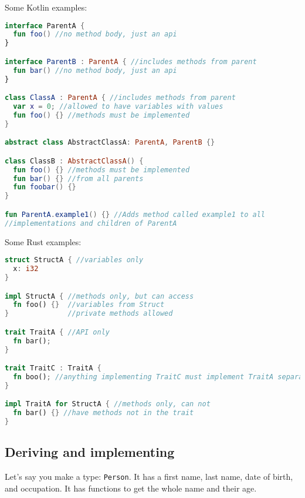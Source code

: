 \documentclass[a4paper,11pt]{article}
\begin{document}
\newpage
Some Kotlin examples:
\begin{lstlisting}[language=Kotlin,frame=single]
interface ParentA {
  fun foo() //no method body, just an api
}

interface ParentB : ParentA { //includes methods from parent
  fun bar() //no method body, just an api
}

class ClassA : ParentA { //includes methods from parent
  var x = 0; //allowed to have variables with values
  fun foo() {} //methods must be implemented
}

abstract class AbstractClassA: ParentA, ParentB {}

class ClassB : AbstractClassA() {
  fun foo() {} //methods must be implemented
  fun bar() {} //from all parents
  fun foobar() {}
}

fun ParentA.example1() {} //Adds method called example1 to all
//implementations and children of ParentA
\end{lstlisting}

Some Rust examples:
\begin{lstlisting}[language=Rust,frame=single]
struct StructA { //variables only
  x: i32
}

impl StructA { //methods only, but can access
  fn foo() {}  //variables from Struct 
}              //private methods allowed

trait TraitA { //API only
  fn bar();
}

trait TraitC : TraitA { 
  fn boo(); //anything implementing TraitC must implement TraitA separately
}

impl TraitA for StructA { //methods only, can not 
  fn bar() {} //have methods not in the trait
} 
\end{lstlisting}
\newpage
\subsection{Deriving and implementing}
Let's say you make a type: \lstinline{Person}. It has a first name, last name, date of birth, and occupation. It has functions to get the whole name and their age. 
\end{document}
